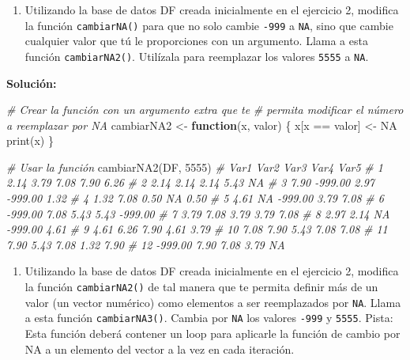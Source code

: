 \documentclass[
]{article}
\newenvironment{Shaded}{\begin{snugshade}}{\end{snugshade}}
\newcommand{\CommentTok}[1]{\textcolor[rgb]{0.56,0.35,0.01}{\textit{#1}}}
\newcommand{\ConstantTok}[1]{\textcolor[rgb]{0.00,0.00,0.00}{#1}}
\newcommand{\ControlFlowTok}[1]{\textcolor[rgb]{0.13,0.29,0.53}{\textbf{#1}}}
\newcommand{\DecValTok}[1]{\textcolor[rgb]{0.00,0.00,0.81}{#1}}
\newcommand{\FunctionTok}[1]{\textcolor[rgb]{0.00,0.00,0.00}{#1}}
\newcommand{\NormalTok}[1]{#1}
\newcommand{\OtherTok}[1]{\textcolor[rgb]{0.56,0.35,0.01}{#1}}
\newcommand{\SpecialCharTok}[1]{\textcolor[rgb]{0.00,0.00,0.00}{#1}}
\providecommand{\tightlist}{%
  \setlength{\itemsep}{0pt}\setlength{\parskip}{0pt}}
\theoremstyle{definition}
\theoremstyle{definition}
\theoremstyle{definition}
\theoremstyle{definition}
\theoremstyle{remark}
\begin{document}
\begin{enumerate}
\def\labelenumi{\arabic{enumi}.}
\tightlist
\item
  Utilizando la base de datos DF creada inicialmente en el ejercicio 2, modifica la función \texttt{cambiarNA()} para que no solo cambie \texttt{-999} a \texttt{NA}, sino que cambie cualquier valor que tú le proporciones con un argumento. Llama a esta función \texttt{cambiarNA2()}. Utilízala para reemplazar los valores \texttt{5555} a \texttt{NA}.
\end{enumerate}

\textbf{Solución:}

\begin{Shaded}
\begin{Highlighting}[]
\CommentTok{\# Crear la función con un argumento extra que te }
\CommentTok{\# permita modificar el número a reemplazar por NA }
\NormalTok{cambiarNA2 }\OtherTok{\textless{}{-}} \ControlFlowTok{function}\NormalTok{(x, valor) \{}
\NormalTok{  x[x }\SpecialCharTok{==}\NormalTok{ valor] }\OtherTok{\textless{}{-}} \ConstantTok{NA}
  \FunctionTok{print}\NormalTok{(x)}
\NormalTok{\}}

\CommentTok{\# Usar la función}
\FunctionTok{cambiarNA2}\NormalTok{(DF, }\DecValTok{5555}\NormalTok{)}
\CommentTok{\#       Var1    Var2    Var3    Var4    Var5}
\CommentTok{\# 1     2.14    3.79    7.08    7.90    6.26}
\CommentTok{\# 2     2.14    2.14    2.14    5.43      NA}
\CommentTok{\# 3     7.90 {-}999.00    2.97 {-}999.00    1.32}
\CommentTok{\# 4     1.32    7.08    0.50      NA    0.50}
\CommentTok{\# 5     4.61      NA {-}999.00    3.79    7.08}
\CommentTok{\# 6  {-}999.00    7.08    5.43    5.43 {-}999.00}
\CommentTok{\# 7     3.79    7.08    3.79    3.79    7.08}
\CommentTok{\# 8     2.97    2.14      NA {-}999.00    4.61}
\CommentTok{\# 9     4.61    6.26    7.90    4.61    3.79}
\CommentTok{\# 10    7.08    7.90    5.43    7.08    7.08}
\CommentTok{\# 11    7.90    5.43    7.08    1.32    7.90}
\CommentTok{\# 12 {-}999.00    7.90    7.08    3.79      NA}
\end{Highlighting}
\end{Shaded}

\begin{enumerate}
\def\labelenumi{\arabic{enumi}.}
\tightlist
\item
  Utilizando la base de datos DF creada inicialmente en el ejercicio 2, modifica la función \texttt{cambiarNA2()} de tal manera que te permita definir más de un valor (un vector numérico) como elementos a ser reemplazados por \texttt{NA}. Llama a esta función \texttt{cambiarNA3()}. Cambia por \texttt{NA} los valores \texttt{-999} y \texttt{5555}. Pista: Esta función deberá contener un loop para aplicarle la función de cambio por NA a un elemento del vector a la vez en cada iteración.
\end{enumerate}
\end{document}
